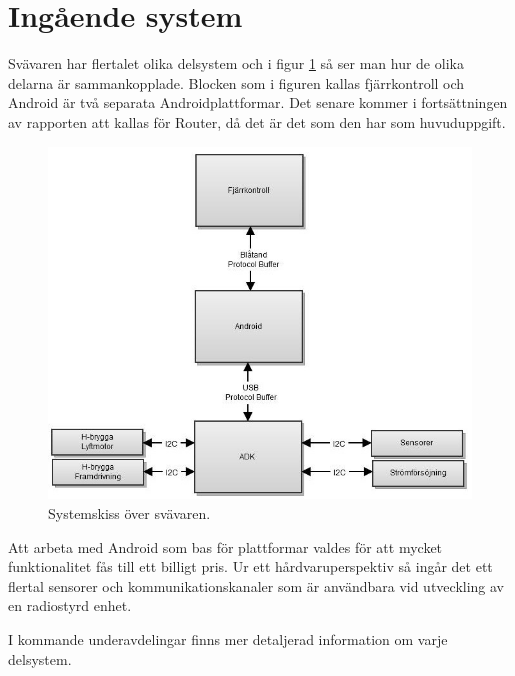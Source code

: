 \section{Ingående system}
Svävaren har flertalet olika delsystem och i figur \ref{fig:Systemskiss} så ser
man hur de olika delarna är sammankopplade. Blocken som i figuren kallas
fjärrkontroll och Android är två separata Androidplattformar. Det senare kommer
i fortsättningen av rapporten att kallas för Router, då det är det som den har
som huvuduppgift.

\begin{figure}[htbp!] 
\centering 
\includegraphics[width=13cm]{../includes/figures/Systemskiss} 
\caption{Systemskiss över svävaren.} 
\label{fig:Systemskiss} 
\end{figure}

Att arbeta med Android som bas för plattformar valdes för att mycket
funktionalitet fås till ett billigt pris. Ur ett
hårdvaruperspektiv så ingår det ett flertal sensorer och kommunikationskanaler
som är användbara vid utveckling av en radiostyrd enhet.

I kommande underavdelingar finns mer detaljerad information om varje delsystem.







